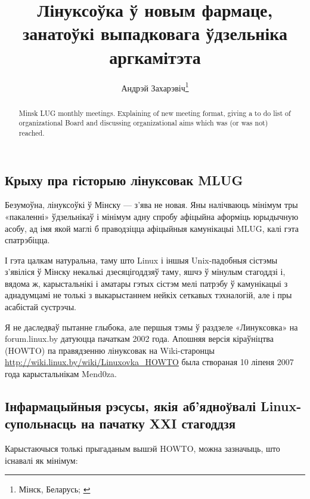 \documentclass[10pt, a5paper]{article}
\begin{document}

\title{Лінуксоўка ў новым фармаце, занатоўкі выпадковага ўдзельніка аргкамітэта}%

\author{Андрэй Захарэвіч\footnote{Мінск, Беларусь; \url{}}}
\maketitle

\begin{abstract}
Minsk LUG monthly meetings. Explaining of new meeting format, giving a to do list of organizational Board and discussing organizational aims which was (or was not) reached.
\end{abstract}

\subsection*{Крыху пра гісторыю лінуксовак MLUG}

Безумоўна, лінуксоўкі ў Мінску — з'ява не новая. Яны налічваюць мінімум тры «пакаленні» ўдзельнікаў і мінімум адну спробу афіцыйна аформіць юрыдычную асобу, ад імя якой маглі б праводзіцца афіцыйныя камунікацыі MLUG, калі гэта спатрэбіцца.

І гэта цалкам натуральна, таму што Linux і іншыя Unix-падобныя сістэмы з'явіліся ў Мінску некалькі дзесяцігоддзяў таму, яшчэ ў мінулым стагоддзі і, вядома ж, карыстальнікі і аматары гэтых сістэм мелі патрэбу ў камунікацыі з аднадумцамі не толькі з выкарыстаннем нейкіх сеткавых тэхналогій, але і пры асабістай сустрэчы.

Я не даследваў пытанне глыбока, але першыя тэмы ў раздзеле «Линуксовка» на forum.linux.by датуюцца пачаткам 2002 года. Апошняя версія кіраўніцтва (HOWTO) па правядзенню лінуксовак на Wiki-старонцы \url{http://wiki.linux.by/wiki/Linuxovka\_HOWTO} была створаная 10 ліпеня 2007 года карыстальнікам Mend0za.

\subsection*{Інфармацыйныя рэсусы, якія аб'ядноўвалі Linux-супольнасць на пачатку XXI стагоддзя}

Карыстаючыся толькі прыгаданым вышэй HOWTO, можна зазначыць, што існавалі як мінімум:
\end{document}
